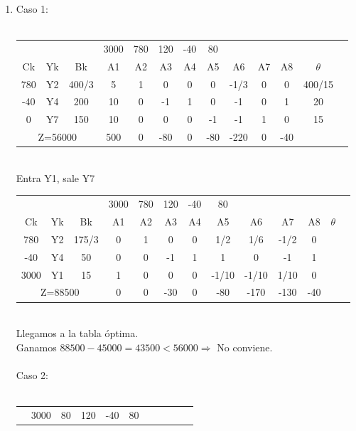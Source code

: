 \documentclass{article}
\begin{document}
\begin{enumerate}
\begin{figure}[H]
		\end{figure}
     	\smallskip
	\newpage	
	\item Caso 1:\\
     	\smallskip\\
		\begin{tabular}{|c  c  c | c  c  c  c  c  c  c  c  c | c |}
			\hline
			 \multicolumn{3}{|c|}{} & 3000 & 780 & 120 & -40 & 80 & & & & \\ 
			 Ck & Yk & Bk & A1 & A2 & A3 & A4 & A5 & A6 & A7 & A8 & $\theta$\\ \hline 
			 780 & Y2 & 400/3 & 5 & 1 & 0 & 0 & 0 & -1/3 & 0 & 0 & 400/15\\
			 -40 & Y4 & 200 & 10 & 0 & -1 & 1 & 0 & -1 & 0 & 1 & 20\\
			 0 & Y7 & 150 & 10 & 0 & 0 & 0 & -1 & -1 & 1 & 0 & 15\\ \hline
			 \multicolumn{3}{|c|}{Z=56000} & 500 & 0 & -80 & 0 & -80 & -220 & 0 & -40\\ \hline
		\end{tabular}
		\medskip\\
		Entra Y1, sale Y7\\
		\begin{tabular}{|c  c  c | c  c  c  c  c  c  c  c  c | c |}
			\hline
			 \multicolumn{3}{|c|}{} & 3000 & 780 & 120 & -40 & 80 & & & & \\ 
			 Ck & Yk & Bk & A1 & A2 & A3 & A4 & A5 & A6 & A7 & A8 & $\theta$\\ \hline 
			 780 & Y2 & 175/3 & 0 & 1 & 0 & 0 & 1/2 & 1/6 & -1/2 & 0 & \\
			 -40 & Y4 & 50 & 0 & 0 & -1 & 1 & 1 & 0 & -1 & 1 & \\
			 3000 & Y1 & 15 & 1 & 0 & 0 & 0 & -1/10 & -1/10 & 1/10 & 0 & \\ \hline
			 \multicolumn{3}{|c|}{Z=88500} & 0 & 0 & -30 & 0 & -80 & -170 & -130 & -40\\ \hline
		\end{tabular}
		\medskip\\
		Llegamos a la tabla \'optima.\\
		Ganamos $88500 - 45000 = 43500 < 56000 \Rightarrow $ No conviene.\\
		\smallskip\\
		Caso 2:\\
     	\smallskip\\
		\begin{tabular}{|c  c  c | c  c  c  c  c  c  c  c  c | c |}
			\hline
			 \multicolumn{3}{|c|}{} & 3000 & 80 & 120 & -40 & 80 & & & & \\ 

\end{tabular}
\end{enumerate}
\end{document}
